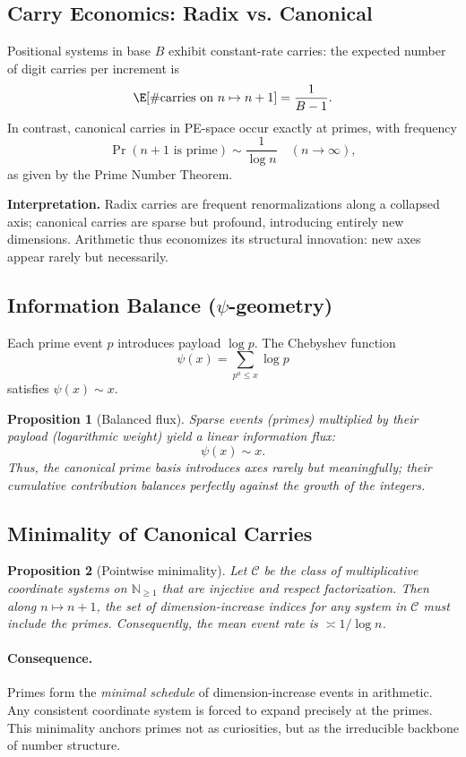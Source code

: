 \documentclass[11pt]{article}
\theoremstyle{plain}
\newtheorem{proposition}{Proposition}
\theoremstyle{definition}
\newcommand{\N}{\mathbb{N}}
\begin{document}
\subsection{Carry Economics: Radix vs. Canonical}
Positional systems in base $B$ exhibit constant-rate carries: the expected number of digit carries per increment is
\[
\E[\#\text{carries on } n \mapsto n+1] = \frac{1}{B-1}.
\]
In contrast, canonical carries in PE-space occur exactly at primes, with frequency
\[
\Pr(n+1 \text{ is prime}) \sim \frac{1}{\log n} \quad (n \to \infty),
\]
as given by the Prime Number Theorem.  

\textbf{Interpretation.}  
Radix carries are frequent renormalizations along a collapsed axis; canonical carries are sparse but profound, introducing entirely new dimensions. Arithmetic thus economizes its structural innovation: new axes appear rarely but necessarily.

\subsection{Information Balance ($\psi$-geometry)}
Each prime event $p$ introduces payload $\log p$. The Chebyshev function
\[
\psi(x) = \sum_{p^a \leq x} \log p
\]
satisfies $\psi(x) \sim x$.  

\begin{proposition}[Balanced flux]
Sparse events (primes) multiplied by their payload (logarithmic weight) yield a linear information flux:
\[
\psi(x) \sim x.
\]
Thus, the canonical prime basis introduces axes rarely but meaningfully; their cumulative contribution balances perfectly against the growth of the integers.
\end{proposition}

\subsection{Minimality of Canonical Carries}
\begin{proposition}[Pointwise minimality]
Let $\mathcal{C}$ be the class of multiplicative coordinate systems on $\N_{\geq 1}$ that are injective and respect factorization.  
Then along $n \mapsto n+1$, the set of dimension-increase indices for any system in $\mathcal{C}$ must include the primes. Consequently, the mean event rate is $\asymp 1/\log n$.
\end{proposition}

\paragraph{Consequence.}
Primes form the \emph{minimal schedule} of dimension-increase events in arithmetic. Any consistent coordinate system is forced to expand precisely at the primes. This minimality anchors primes not as curiosities, but as the irreducible backbone of number structure.
\end{document}
